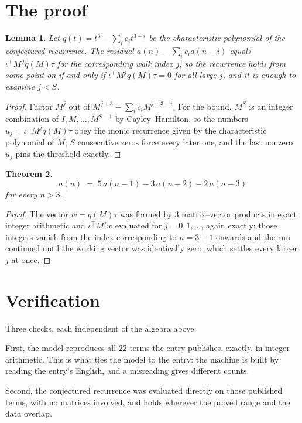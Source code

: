 \documentclass[11pt,a4paper]{article}
\theoremstyle{plain}
\newtheorem{theorem}{Theorem}
\newtheorem{lemma}[theorem]{Lemma}
\theoremstyle{definition}
\begin{document}
\section{The proof}

\begin{lemma}\label{lem:crit}
Let $q(t)=t^{3}-\sum_i c_it^{3-i}$ be the characteristic polynomial of the
conjectured recurrence. The residual $a(n)-\sum_ic_ia(n-i)$ equals
$\iota^{\!\top}M^{\,j}q(M)\tau$ for the corresponding walk index $j$, so the recurrence
holds from some point on if and only if $\iota^{\!\top}M^{j}q(M)\tau=0$ for all large $j$,
and it is enough to examine $j<S$.
\end{lemma}

\begin{proof}
Factor $M^{j}$ out of $M^{j+3}-\sum_ic_iM^{j+3-i}$. For the bound, $M^{S}$
is an integer combination of $I,M,\dots,M^{S-1}$ by Cayley--Hamilton, so the numbers
$u_j=\iota^{\!\top}M^{j}q(M)\tau$ obey the monic recurrence given by the characteristic
polynomial of $M$; $S$ consecutive zeros force every later one, and the last nonzero $u_j$
pins the threshold exactly.
\end{proof}

\begin{theorem}
\[
a(n)\;=\;5\,a(n-1) - 3\,a(n-2) - 2\,a(n-3)
\]
for every $n>3$.
\end{theorem}

\begin{proof}
The vector $w=q(M)\tau$ was formed by $3$ matrix--vector products in exact integer
arithmetic and $\iota^{\!\top}M^{j}w$ evaluated for $j=0,1,\dots$, again exactly; those
integers vanish from the index corresponding to $n=3+1$ onwards and the run continued
until the working vector was identically zero, which settles every larger $j$ at once.
\end{proof}

\section{Verification}

Three checks, each independent of the algebra above.

First, the model reproduces all $22$ terms the entry publishes, exactly, in integer
arithmetic. This is what ties the model to the entry: the machine is built by reading the
entry's English, and a misreading gives different counts.

Second, the conjectured recurrence was evaluated directly on those published terms, with no
matrices involved, and holds wherever the proved range and the data overlap.
\end{document}

